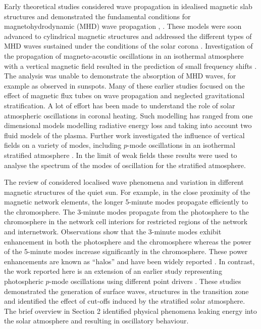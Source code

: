 \documentclass[physics,article,submit,pdftex,moreauthors]{Definitions/mdpi}
\begin{document}
Early theoretical studies   considered wave propagation in idealised magnetic slab structures and demonstrated the fundamental conditions for  magnetohydrodynamic (MHD) wave propagation  \cite{Roberts1981a}, \cite{Roberts1981b}. These models were soon advanced to cylindrical magnetic structures and addressed 
the different types of MHD waves sustained under the conditions of the solar corona \cite{EdwinandRoberts1983}.  Investigation of the propagation of magneto-acoustic oscillations in an isothermal atmosphere with a vertical magnetic field resulted in the prediction of small frequency shifts \cite{Hindman1996}. The analysis was unable to demonstrate the absorption of MHD waves,  for example as observed in sunspots. Many of these  earlier studies  focused on the effect of magnetic flux tubes on wave propagation and neglected gravitational stratification. A lot of effort has been made to understand the role of solar atmospheric oscillations in coronal heating. Such modelling has ranged from one dimensional models modelling radiative energy loss  and taking into account two fluid models of the plasma. Further work investigated the influence of vertical fields on a variety of modes, including $p$-mode oscillations in an isothermal stratified atmosphere  \cite{Hasan1992}. In the limit of weak fields these results were used to analyse the spectrum of the modes of oscillation for the stratified atmosphere.

The  review of \cite{Khomenko2013} considered localised wave phenomena and variation in different magnetic structures of the quiet sun. For example, in the close proximity of the magnetic network elements, the longer 5-minute modes propagate efficiently to the chromosphere. The 3-minute modes propagate from the photosphere to the chromosphere in the network cell interiors for restricted regions of the network and internetwork.  Observations show that the 3-minute modes exhibit enhancement in both the photosphere and the chromosphere whereas the power of the 5-minute modes increase significantly in the chromosphere. These power enhancements are known as “halos” and have been widely reported \cite{Kontogiannis2010}. 
In contrast, the work reported here is an extension of an earlier study representing photospheric $p$-mode oscillations using different point drivers  \cite{Malins2007}. These studies demonstrated  the generation of surface waves, structures in the transition zone and identified the effect of cut-offs induced by the stratified  solar atmosphere. The  brief overview in Section 2 identified physical phenomena leaking energy into the solar atmosphere and resulting in oscillatory behaviour. 
\end{document}
